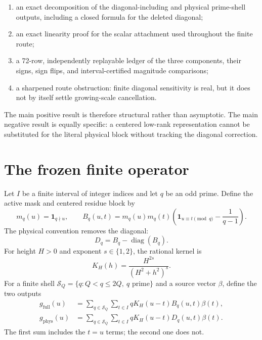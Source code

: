 \documentclass[11pt]{article}
\newcommand{\1}{\mathbf{1}}
\newcommand{\diag}{\operatorname{diag}}
\newcommand{\phys}{\mathrm{phys}}
\newcommand{\full}{\mathrm{full}}
\begin{document}
\begin{enumerate}[leftmargin=1.8em,itemsep=2pt]
  \item an exact decomposition of the diagonal-including and physical
        prime-shell outputs, including a closed formula for the deleted
        diagonal;
  \item an exact linearity proof for the scalar attachment used throughout
        the finite route;
  \item a 72-row, independently replayable ledger of the three components,
        their signs, sign flips, and interval-certified magnitude comparisons;
  \item a sharpened route obstruction: finite diagonal sensitivity is real,
        but it does not by itself settle growing-scale cancellation.
\end{enumerate}

The main positive result is therefore structural rather than asymptotic.  The
main negative result is equally specific: a centered low-rank representation
cannot be substituted for the literal physical block without tracking the
diagonal correction.

\section{The frozen finite operator}

Let $I$ be a finite interval of integer indices and let $q$ be an odd prime.
Define the active mask and centered residue block by
\begin{equation}
 m_q(u)=\mathbf 1_{q\nmid u},\qquad
 B_q(u,t)=m_q(u)m_q(t)
 \left(\mathbf 1_{u\equiv t\pmod q}-\frac{1}{q-1}\right).
 \label{eq:block}
\end{equation}
The physical convention removes the diagonal:
\begin{equation}
 D_q=B_q-\diag(B_q).
 \label{eq:deleted}
\end{equation}
For height $H>0$ and exponent $s\in\{1,2\}$, the rational kernel is
\begin{equation}
 K_H(h)=\frac{H^{2s}}{(H^2+h^2)^s}.
 \label{eq:kernel}
\end{equation}
For a finite shell $\mathcal S_Q=\{q:Q<q\leq2Q,\ q\text{ prime}\}$ and a
source vector $\beta$, define the two outputs
\begin{align}
 g_{\full}(u)
  &=\sum_{q\in\mathcal S_Q}\sum_{t\in I}
       qK_H(u-t)B_q(u,t)\beta(t),\label{eq:full}\\
 g_{\phys}(u)
  &=\sum_{q\in\mathcal S_Q}\sum_{t\in I}
       qK_H(u-t)D_q(u,t)\beta(t).\label{eq:physical}
\end{align}
The first sum includes the $t=u$ terms; the second one does not.
\end{document}
